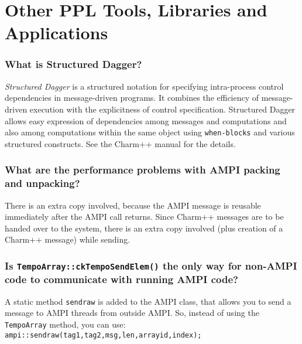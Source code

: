 \section{Other PPL Tools, Libraries and Applications}

\subsubsection{What is Structured Dagger?}

{\em Structured Dagger} is a structured notation for specifying intra-process
control dependencies in message-driven programs. It combines the efficiency
of message-driven execution with the explicitness of control specification.
Structured Dagger allows easy expression of dependencies among messages
and computations and also among computations within the same object using
{\tt when-blocks}
and various structured constructs. See the Charm++ manual for the details.

\subsubsection{What are the performance problems with AMPI packing and unpacking?}

There is an extra copy involved, because the AMPI message is reusable
immediately after the AMPI call returns. Since Charm++ messages are to
be handed over to the system, there is an extra copy involved (plus creation
of a Charm++ message) while sending.



\subsubsection{Is {\tt TempoArray::ckTempoSendElem()} the only way for non-AMPI
code to communicate with running AMPI code?}

A static method {\tt sendraw} is added to the AMPI class, that allows
you to send a message to AMPI threads from outside AMPI. So, instead of
using the {\tt TempoArray} method, you can use:
{\tt ampi::sendraw(tag1,tag2,msg,len,arrayid,index);}

